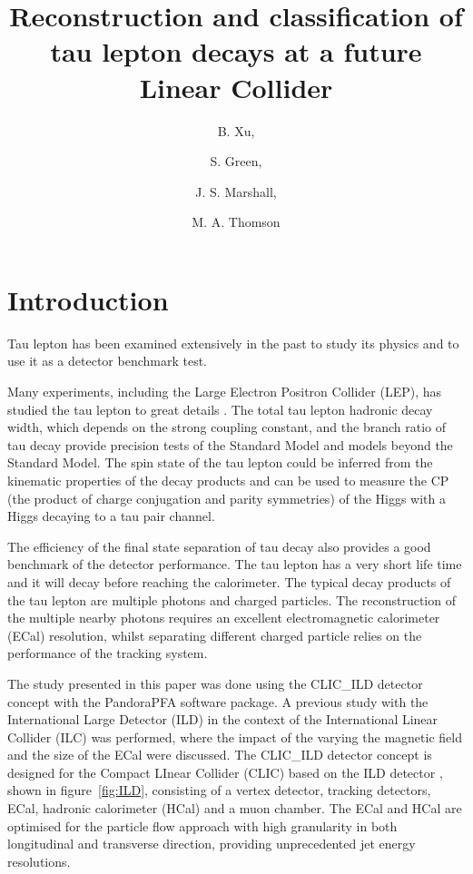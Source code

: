 \documentclass[a4paper,11pt]{article}
\title{\boldmath Reconstruction and classification of tau lepton decays at a future \Pem \Pep Linear Collider}
\author[a,1]{B. Xu,\note{Corresponding author.}}
\author[a]{S. Green,}
\author[a]{J. S. Marshall,}
\author[a]{M. A. Thomson}
\affiliation[a]{Cavendish Laboratory,\\JJ Thomson Avenue, Cambridge, CB3 0HE, UK}
\begin{document}
\maketitle
\flushbottom


\section{Introduction}

Tau lepton has been examined extensively in the past to study its physics and to use it as a detector benchmark test. 

Many experiments, including the Large Electron Positron Collider (LEP), has studied the tau lepton to great details \cite{Schael:2005am}. The total tau lepton hadronic decay width, which depends on the strong coupling constant, and the branch ratio of tau decay provide precision tests of the Standard Model and models beyond the Standard Model. The spin state of the tau lepton could be inferred from the kinematic properties of the decay products and can be used to measure the CP (the product of charge conjugation and parity symmetries) of the Higgs with a Higgs decaying to a tau pair channel. 

The efficiency of the final state separation of tau decay also provides a good benchmark of the detector performance. The tau lepton has a very short life time and it will decay before reaching the calorimeter. The typical decay products of the tau lepton are multiple photons and charged particles. The reconstruction of the multiple nearby photons requires an excellent electromagnetic calorimeter (ECal) resolution, whilst separating different charged particle relies on the performance of the tracking system. 


The study presented in this paper was done using the CLIC\_ILD detector concept with the PandoraPFA software package. A previous study with the International Large Detector (ILD) in the context of the International Linear Collider (ILC) was performed, where the impact of the varying the magnetic field and the size of the ECal were discussed. The CLIC\_ILD detector concept \cite{Linssen:2012hp} is designed for the Compact LInear Collider (CLIC) based on the ILD detector \cite{Abe:2010aa}, shown in figure~\ref{fig:ILD}, consisting of a vertex detector, tracking detectors, ECal, hadronic calorimeter (HCal) and a muon chamber. The ECal and HCal are optimised for the particle flow approach \cite{Thomson:2009rp} with high granularity in both longitudinal and transverse direction, providing unprecedented jet energy resolutions.
\end{document}
